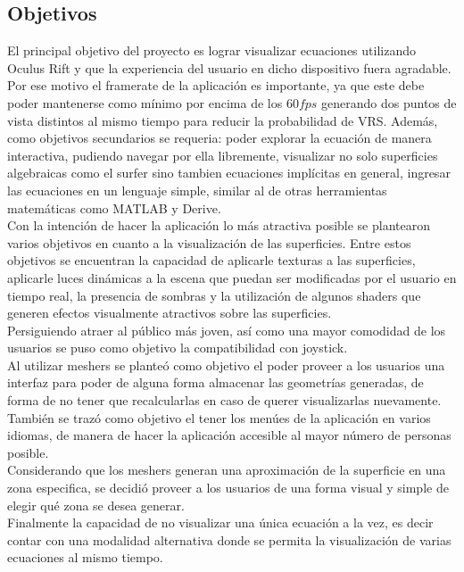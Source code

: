 \documentclass[12pt]{article}
\begin{document}
\subsection{Objetivos}
El principal objetivo del proyecto es lograr visualizar ecuaciones utilizando Oculus Rift y que la experiencia del usuario en dicho dispositivo fuera agradable. Por ese motivo el framerate de la aplicación es importante, ya que este debe poder mantenerse como mínimo por encima de los $60 fps$ generando dos puntos de vista distintos al mismo tiempo para reducir la probabilidad de VRS. Además, como objetivos secundarios se requeria: poder explorar la ecuación de manera interactiva, pudiendo navegar por ella libremente, visualizar no solo superficies algebraicas como el surfer sino tambien ecuaciones implícitas en general, ingresar las ecuaciones en un lenguaje simple, similar al de otras herramientas matemáticas como MATLAB y Derive.
\\Con la intención de hacer la aplicación lo más atractiva posible se plantearon varios objetivos en cuanto a la visualización de las superficies. Entre estos objetivos se encuentran la capacidad de aplicarle texturas a las superficies, aplicarle luces dinámicas a la escena que puedan ser modificadas por el usuario en tiempo real, la presencia de sombras y la utilización de algunos shaders que generen efectos visualmente atractivos sobre las superficies.
\\Persiguiendo atraer al público más joven, así como una mayor comodidad de los usuarios se puso como objetivo la compatibilidad con joystick.
\\Al utilizar meshers se planteó como objetivo el poder proveer a los usuarios una interfaz para poder de alguna forma almacenar las geometrías generadas, de forma de no tener que recalcularlas en caso de querer visualizarlas nuevamente.
\\También se trazó como objetivo el tener los menúes de la aplicación en varios idiomas, de manera de hacer la aplicación accesible al mayor número de personas posible.
\\Considerando que los meshers generan una aproximación de la superficie en una zona especifica, se decidió proveer a los usuarios de una forma visual y simple de elegir qué zona se desea generar.
\\Finalmente la capacidad de no visualizar una única ecuación a la vez, es decir contar con una modalidad alternativa donde se permita la visualización de varias ecuaciones al mismo tiempo.
\end{document}
